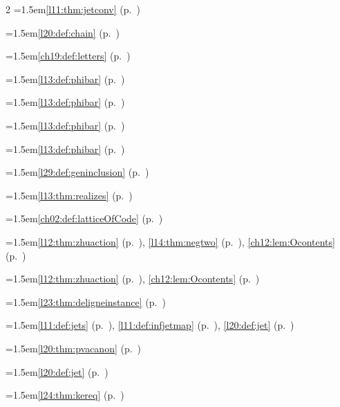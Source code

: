 \begin{multicols}{2}
\hangindent=1.5em\quad \ref{l11:thm:jetconv} (p.~\pageref{l11:thm:jetconv})\par
\hangindent=1.5em\quad \ref{l20:def:chain} (p.~\pageref{l20:def:chain})\par
\hangindent=1.5em\quad \ref{ch19:def:letters} (p.~\pageref{ch19:def:letters})\par
\hangindent=1.5em\quad \ref{l13:def:phibar} (p.~\pageref{l13:def:phibar})\par
\hangindent=1.5em\quad \ref{l13:def:phibar} (p.~\pageref{l13:def:phibar})\par
\hangindent=1.5em\quad \ref{l13:def:phibar} (p.~\pageref{l13:def:phibar})\par
\hangindent=1.5em\quad \ref{l13:def:phibar} (p.~\pageref{l13:def:phibar})\par
\hangindent=1.5em\quad \ref{l29:def:geninclusion} (p.~\pageref{l29:def:geninclusion})\par
\hangindent=1.5em\quad \ref{l13:thm:realizes} (p.~\pageref{l13:thm:realizes})\par
\hangindent=1.5em\quad \ref{ch02:def:latticeOfCode} (p.~\pageref{ch02:def:latticeOfCode})\par
\hangindent=1.5em\quad \ref{l12:thm:zhuaction} (p.~\pageref{l12:thm:zhuaction}), \ref{l14:thm:negtwo} (p.~\pageref{l14:thm:negtwo}), \ref{ch12:lem:Ocontents} (p.~\pageref{ch12:lem:Ocontents})\par
\hangindent=1.5em\quad \ref{l12:thm:zhuaction} (p.~\pageref{l12:thm:zhuaction}), \ref{ch12:lem:Ocontents} (p.~\pageref{ch12:lem:Ocontents})\par
\hangindent=1.5em\quad \ref{l23:thm:deligneinstance} (p.~\pageref{l23:thm:deligneinstance})\par
\hangindent=1.5em\quad \ref{l11:def:jets} (p.~\pageref{l11:def:jets}), \ref{l11:def:infjetmap} (p.~\pageref{l11:def:infjetmap}), \ref{l20:def:jet} (p.~\pageref{l20:def:jet})\par
\hangindent=1.5em\quad \ref{l20:thm:pvacanon} (p.~\pageref{l20:thm:pvacanon})\par
\hangindent=1.5em\quad \ref{l20:def:jet} (p.~\pageref{l20:def:jet})\par
\hangindent=1.5em\quad \ref{l24:thm:kereq} (p.~\pageref{l24:thm:kereq})\par

\end{multicols}
